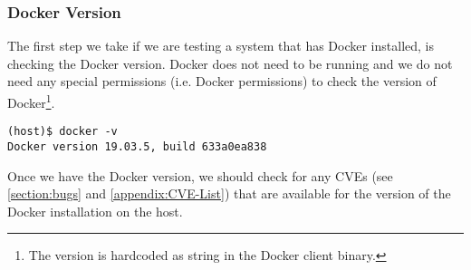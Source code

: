 \subsubsection{Docker Version}\label{subsubsection:version}
The first step we take if we are testing a system that has Docker installed, is checking the Docker version. Docker does not need to be running and we do not need any special permissions (i.e. Docker permissions) to check the version of Docker\footnote{The version is hardcoded as string in the Docker client binary.}.

\begin{lstlisting}[caption={Show Docker version.},captionpos=b]
(host)$ docker -v
Docker version 19.03.5, build 633a0ea838
\end{lstlisting}

Once we have the Docker version, we should check for any CVEs (see \autoref{section:bugs} and \autoref{appendix:CVE-List}) that are available for the version of the Docker installation on the host.
